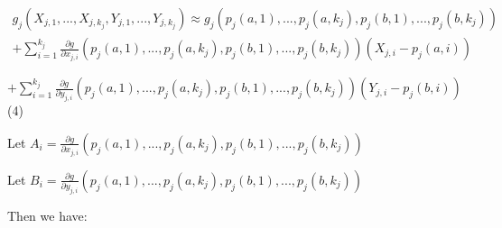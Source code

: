 \documentclass{article}
\begin{document}
$\displaystyle  \begin{array}{l}
g_{j}\left( X_{j,1} ,...,X_{j,k_{j}} ,Y_{j,1} ,...,Y_{j,k_{j}}\right) \approx g_{j}\left( p_{j}\left( a,1\right) ,...,p_{j}\left( a,k_{j}\right) ,p_{j}\left( b,1\right) ,...,p_{j}\left( b,k_{j}\right)\right)\\
+\sum _{i=1}^{k_{j}}\frac{\partial g}{\partial x_{j,i}}\left( p_{j}\left( a,1\right) ,...,p_{j}\left( a,k_{j}\right) ,p_{j}\left( b,1\right) ,...,p_{j}\left( b,k_{j}\right)\right)\left( X_{j,i} -p_{j}\left( a,i\right)\right)
\end{array}$

$\displaystyle +\sum _{i=1}^{k_{j}}\frac{\partial g}{\partial y_{j,i}}\left( p_{j}\left( a,1\right) ,...,p_{j}\left( a,k_{j}\right) ,p_{j}\left( b,1\right) ,...,p_{j}\left( b,k_{j}\right)\right)\left( Y_{j,i} -p_{j}\left( b,i\right)\right)$ (4)



Let $\displaystyle A_{i} =\frac{\partial g}{\partial x_{j,i}}\left( p_{j}\left( a,1\right) ,...,p_{j}\left( a,k_{j}\right) ,p_{j}\left( b,1\right) ,...,p_{j}\left( b,k_{j}\right)\right)$

Let $\displaystyle B_{i} =\frac{\partial g}{\partial y_{j,i}}\left( p_{j}\left( a,1\right) ,...,p_{j}\left( a,k_{j}\right) ,p_{j}\left( b,1\right) ,...,p_{j}\left( b,k_{j}\right)\right)$



Then we have:
\end{document}
